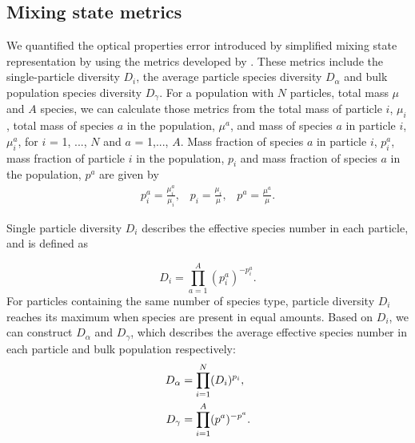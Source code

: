 \documentclass[edeposit,fullpage]{uiucthesis2009}
\begin{document}
\subsection{Mixing state metrics}
We quantified the optical properties error introduced by simplified
mixing state representation by using the metrics developed by \citet{Riemer2013a}. These metrics
include the single-particle diversity $D_i$, the average particle
species diversity $D_\alpha$ and bulk population species diversity
$D_\gamma$. For a population with $N$ particles, total mass $\mu$ and
$A$ species, we can calculate those metrics from the total mass of
particle $i$, $\mu_i$, total mass of species $a$ in the population,
$\mu^a$, and mass of species $a$ in particle $i$, $\mu_i^{a}$, for $i$
= 1, ..., $N$ and $a$ = 1,..., $A$. Mass fraction of species $a$ in
particle $i$, $p_i^a$, mass fraction of particle $i$ in the
population, $p_i$ and mass fraction of species $a$ in the population,
$p^a$ are given by
\begin{equation}
\label{eq:frac}
\begin{split}
    p_i^a = \frac{\mu_i^a}{\mu_i},\;\;\;p_i = \frac{\mu_i}{\mu},\;\;\;p^a = \frac{\mu^a}{\mu}.
\end{split}
\end{equation}

Single particle diversity $D_i$ describes the effective species number
in each particle, and is defined as

\begin{equation}
D_i = \prod_{a=1}^A({p}_i^a)^{-p_i^a}.
\end{equation}
For particles containing the same number of species type, particle
diversity $D_i$ reaches its maximum when species are present in equal
amounts. Based on $D_i$, we can construct $D_\alpha$ and $D_\gamma$,
which describes the average effective species number in each particle
and bulk population respectively:
\begin{align}
\centering
 \label{Dalpha}
 D_\alpha & = \prod_{i=1}^N (D_i)^{p_i},\\
 \label{Dgamma}
 D_\gamma &= \prod_{i=1}^A(p^a)^{-p^a}.  
\end{align}
\end{document}
